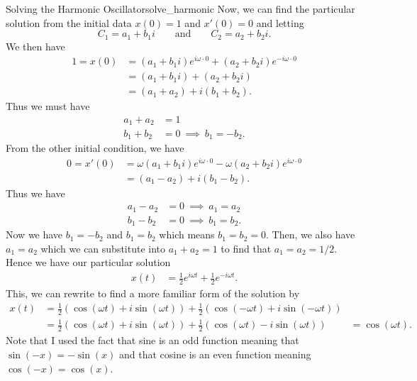 \begin{ex}{Solving the Harmonic Oscillator}{solve_harmonic}
        Now, we can find the particular solution from the initial data $x(0)=1$ and $x'(0)=0$ and letting
        \[
        C_1=a_1+b_1i \qquad \textrm{and} \qquad C_2=a_2+b_2i.
        \]
        We then have
        \begin{align*}
                    1=x(0)&=(a_1+b_1i)e^{i\omega \cdot 0}+(a_2+b_2 i)e^{-i\omega \cdot 0}\\
                    &=(a_1+b_1i)+(a_2+b_2i)\\
                    &=(a_1+a_2)+i(b_1+b_2).
        \end{align*}
        Thus we must have
        \begin{align*}
            a_1+a_2&=1\\
            b_1+b_2&=0 ~\implies~ b_1=-b_2.
        \end{align*}
        From the other initial condition, we have
        \begin{align*}
        0=x'(0)&=\omega(a_1+b_1i)e^{i\omega \cdot 0}-\omega (a_2+b_2i)e^{i\omega \cdot 0}\\
        &=(a_1-a_2)+i(b_1-b_2).
        \end{align*}
        Thus we have
        \begin{align*}
            a_1-a_2&=0 ~\implies~ a_1=a_2\\
            b_1-b_2&=0 ~\implies~ b_1=b_2.
        \end{align*}
        Now we have $b_1=-b_2$ and $b_1=b_2$ which means $b_1=b_2=0$.  Then, we also have $a_1=a_2$ which we can substitute into $a_1+a_2=1$ to find that $a_1=a_2=1/2$.  Hence we have our particular solution
        \begin{align*}
            x(t)&=\frac{1}{2}e^{i\omega t}+\frac{1}{2}e^{-i\omega t}.
            \end{align*}
            This, we can rewrite to find a more familiar form of the solution by
            \begin{align*}
            x(t)&= \frac{1}{2}(\cos(\omega t)+i\sin(\omega t)) + \frac{1}{2}(\cos(-\omega t)+i\sin(-\omega t))\\
            &= \frac{1}{2}(\cos(\omega t)+i\sin(\omega t))+\frac{1}{2}(\cos(\omega t)-i\sin(\omega t))
            &=\cos(\omega t).
        \end{align*}
        Note that I used the fact that sine is an odd function meaning that $\sin(-x)=-\sin(x)$ and that cosine is an even function meaning $\cos(-x)=\cos(x)$.
        \end{ex}

